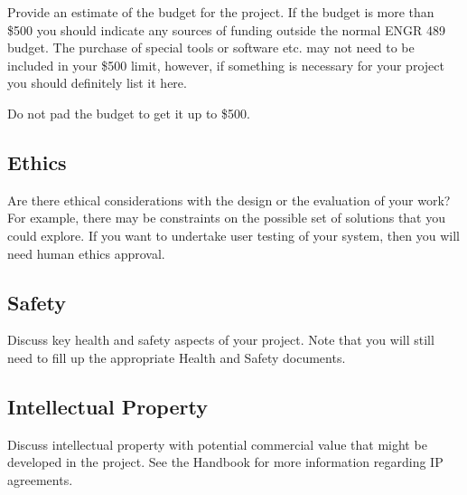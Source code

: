 \documentclass[11pt, a4paper, oneside, openright]{article}
\begin{document}
Provide an estimate of the budget for the project. If the budget is more than
\$500 you should indicate any sources of funding outside the normal ENGR 489
budget. The purchase of special tools or software etc. may not need to be
included in your \$500 limit, however, if something is necessary for your
project you should definitely list it here.

Do not pad the budget to get it up to \$500.

\subsection{Ethics}

Are there ethical considerations with the design or the evaluation of your work?
For example, there may be constraints on the possible set of solutions that you
could explore. If you want to undertake user testing of your system, then you
will need human ethics approval.

\subsection{Safety}

Discuss key health and safety aspects of your project. Note that you will still
need to fill up the appropriate Health and Safety documents.

\subsection{Intellectual Property}

Discuss intellectual property with potential commercial value that might be
developed in the project. See the Handbook for more information regarding IP
agreements.  

\backmatter

\printbibliography
\end{document}

